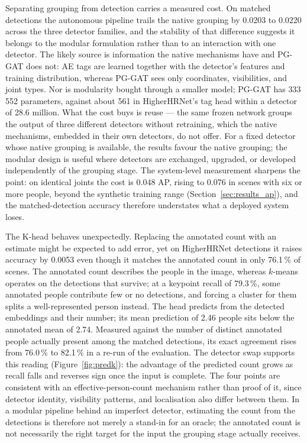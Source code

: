 Separating grouping from detection carries a measured cost.
On matched detections the autonomous pipeline trails the native grouping by 0.0203 to 0.0220 across the three detector
families, and the stability of that difference suggests it belongs to the modular formulation rather than to an
interaction with one detector.
The likely source is information the native mechanisms have and PG-GAT does not: AE tags are learned together with the
detector's features and training distribution, whereas PG-GAT sees only coordinates, visibilities, and joint types.
Nor is modularity bought through a smaller model; PG-GAT has 333\,552 parameters, against about 561 in HigherHRNet's tag
head within a detector of 28.6 million.
What the cost buys is reuse --- the same frozen network groups the output of three different detectors without
retraining, which the native mechanisms, embedded in their own detectors, do not offer.
For a fixed detector whose native grouping is available, the results favour the native grouping; the modular design is
useful where detectors are exchanged, upgraded, or developed independently of the grouping stage.
The system-level measurement sharpens the point: on identical joints the cost is 0.048 AP, rising to 0.076 in scenes with
six or more people, beyond the synthetic training range (Section~\ref{sec:results_ap}), and the matched-detection
accuracy therefore understates what a deployed system loses.

The K-head behaves unexpectedly.
Replacing the annotated count with an estimate might be expected to add error, yet on HigherHRNet detections it raises
accuracy by 0.0053 even though it matches the annotated count in only 76.1\,\% of scenes.
The annotated count describes the people in the image, whereas $k$-means operates on the detections that survive; at a
keypoint recall of 79.3\,\%, some annotated people contribute few or no detections, and forcing a cluster for them
splits a well-represented person instead.
The head predicts from the detected embeddings and their number; its mean prediction of 2.46 people sits below the
annotated mean of 2.74.
Measured against the number of distinct annotated people actually present among the matched detections, its exact
agreement rises from 76.0\,\% to 82.1\,\% in a re-run of the evaluation.
The detector swap supports this reading (Figure~\ref{fig:predk}): the advantage of the predicted count grows as recall
falls and reverses sign once the input is complete.
The four points are consistent with an effective-person-count mechanism rather than proof of it, since detector
identity, visibility patterns, and localisation also differ between them.
In a modular pipeline behind an imperfect detector, estimating the count from the detections is therefore not merely a
stand-in for an oracle; the annotated count is not necessarily the right target for the input the grouping stage
actually receives.

